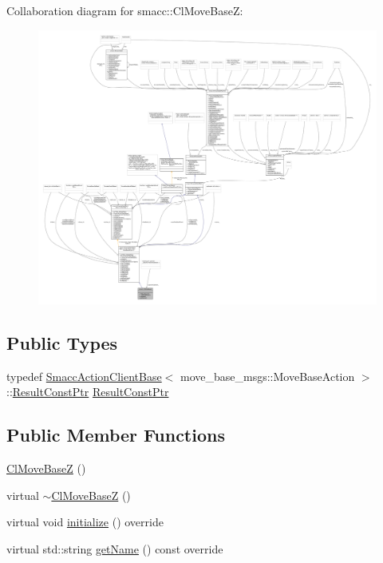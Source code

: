 Collaboration diagram for smacc\+:\+:Cl\+Move\+BaseZ\+:
\nopagebreak
\begin{figure}[H]
\begin{center}
\leavevmode
\includegraphics[width=350pt]{classsmacc_1_1ClMoveBaseZ__coll__graph}
\end{center}
\end{figure}
\subsection*{Public Types}
\begin{DoxyCompactItemize}
\item 
typedef \hyperlink{classsmacc_1_1SmaccActionClientBase}{Smacc\+Action\+Client\+Base}$<$ move\+\_\+base\+\_\+msgs\+::\+Move\+Base\+Action $>$\+::\hyperlink{classsmacc_1_1ClMoveBaseZ_a0389d198a678c4561d7ac7abca76f143}{Result\+Const\+Ptr} \hyperlink{classsmacc_1_1ClMoveBaseZ_a0389d198a678c4561d7ac7abca76f143}{Result\+Const\+Ptr}
\end{DoxyCompactItemize}
\subsection*{Public Member Functions}
\begin{DoxyCompactItemize}
\item 
\hyperlink{classsmacc_1_1ClMoveBaseZ_ab8c94cd18bdd7ca437d5ad37483271b4}{Cl\+Move\+BaseZ} ()
\item 
virtual \hyperlink{classsmacc_1_1ClMoveBaseZ_a74912dd617e43a30376c9c94ab522ca0}{$\sim$\+Cl\+Move\+BaseZ} ()
\item 
virtual void \hyperlink{classsmacc_1_1ClMoveBaseZ_a0eb8e4a0e80456fa534bbef7b2e330a5}{initialize} () override
\item 
virtual std\+::string \hyperlink{classsmacc_1_1ClMoveBaseZ_aa0292ad4bf6ddd4591d239c71ae0d06a}{get\+Name} () const override
\end{DoxyCompactItemize}
